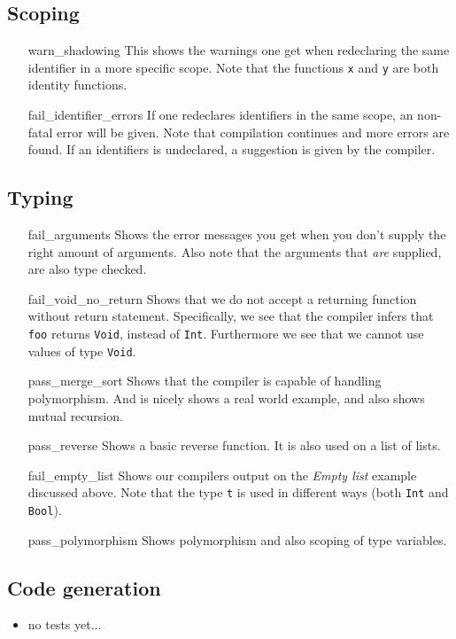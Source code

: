 \documentclass[14pt]{amsart}
\begin{document}
\subsection{Scoping}
\begin{itemize}
	\item[warn\_shadowing] This shows the warnings one get when redeclaring the same identifier in a more specific scope. Note that the functions \texttt{x} and \texttt{y} are both identity functions.
	\item[fail\_identifier\_errors] If one redeclares identifiers in the same scope, an non-fatal error will be given. Note that compilation continues and more errors are found. If an identifiers is undeclared, a suggestion is given by the compiler.
\end{itemize}
\subsection{Typing}
\begin{itemize}
	\item[fail\_arguments] Shows the error messages you get when you don't supply the right amount of arguments. Also note that the arguments that \emph{are} supplied, are also type checked.
	\item[fail\_void\_no\_return] Shows that we do not accept a returning function without return statement. Specifically, we see that the compiler infers that \texttt{foo} returns \texttt{Void}, instead of \texttt{Int}. Furthermore we see that we cannot use values of type \texttt{Void}.
	\item[pass\_merge\_sort] Shows that the compiler is capable of handling polymorphism. And is nicely shows a real world example, and also shows mutual recursion.
	\item[pass\_reverse] Shows a basic reverse function. It is also used on a list of lists.
	\item[fail\_empty\_list] Shows our compilers output on the \emph{Empty list} example discussed above. Note that the type \texttt{t} is used in different ways (both \texttt{Int} and \texttt{Bool}).
	\item[pass\_polymorphism] Shows polymorphism and also scoping of type variables.
\end{itemize}
\subsection{Code generation}
\begin{itemize}
	\item no tests yet...
\end{itemize}
\end{document}
